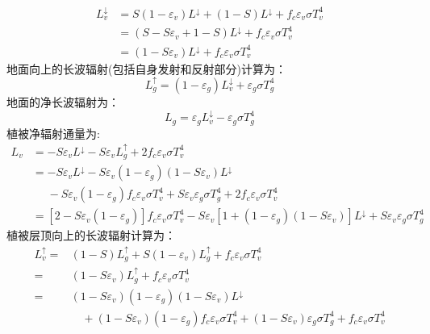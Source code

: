 \begin{equation}
\begin{aligned} 
L_{v} ^\downarrow &=S\left(1-\varepsilon_{v}\right) L ^\downarrow+(1-S) L ^\downarrow+f_{c} \varepsilon_{v} \sigma T_{v}^{4} \\ 
  &=\left(S-S \varepsilon_{v}+1-S\right) L ^\downarrow+f_{c} \varepsilon_{v} \sigma T_{v}^{4} \\ 
  &=\left(1-S \varepsilon_{v}\right) L ^\downarrow+f_{c} \varepsilon_{v} \sigma T_{v}^{4} 
\end{aligned}
\end{equation}
地面向上的长波辐射(包括自身发射和反射部分)计算为：
\begin{equation}
L_{g} ^\uparrow=\left(1-\varepsilon_{g}\right) L_{v} ^\downarrow+\varepsilon_{g} \sigma T_{g}^{4}
\end{equation}
地面的净长波辐射为：
\begin{equation}
{L_{g}}=\varepsilon_{g} L_{v} ^\downarrow -\varepsilon_{g} \sigma T_{g}^{4}
\end{equation}
植被净辐射通量为:
\begin{equation}
\begin{aligned} {L_{v}} &=-S \varepsilon_{v} L ^\downarrow-S \varepsilon_{v} L_{g} 
    ^\uparrow+2 f_{c} \varepsilon_{v} \sigma T_{v}^{4} \\ 
    &=-S \varepsilon_{v} L ^\downarrow-S 
    \varepsilon_{v}\left(1-\varepsilon_{g}\right)\left(1-S \varepsilon_{v}\right) L^\downarrow \\ 
    &\mathrel{\phantom{=}} -S \varepsilon_{v}\left(1-\varepsilon_{g}\right) f_{c} \varepsilon_{v} \sigma T_{v}^{4}+S
     \varepsilon_{v} \varepsilon_{g} \sigma T_{g}^{4}+2 f_{c} \varepsilon_{v} \sigma T_{v}^{4} \\ 
     &=\left[2-S \varepsilon_{v}\left(1-\varepsilon_{g}\right)\right] f_{c} \varepsilon_{v} 
     \sigma T_{v}^{4}-S \varepsilon_{v}\left[1+\left(1-\varepsilon_{g}\right)\left(1-S \varepsilon_{v}\right)\right]
      L ^\downarrow+S \varepsilon_{v} \varepsilon_{g} \sigma T_{g}^{4} \end{aligned}
\end{equation}
植被层顶向上的长波辐射计算为：
\begin{equation}
\begin{aligned} L_v ^\uparrow=&(1-S) L_{g} ^\uparrow+S\left(1-\varepsilon_{v}\right) L_{g} 
    ^\uparrow+f_{c} \varepsilon_{v} \sigma T_{v}^{4} \\=&\left(1-S \varepsilon_{v}\right) L_{g}
     ^\uparrow+f_{c} \varepsilon_{v} \sigma T_{v}^{4} \\=&\left(1-S \varepsilon_{v}\right)\left(1-\varepsilon_{g}\right)\left(1-S \varepsilon_{v}\right) L^\downarrow \\
      & \quad +\left(1-S \varepsilon_{v}\right)\left(1-\varepsilon_{g}\right) f_{c} \varepsilon_{v} \sigma T_{v}^{4}+\left(1-S \varepsilon_{v}\right) 
      \varepsilon_{g} \sigma T_{g}^{4}+f_{c} \varepsilon_{v} \sigma T_{v}^{4} \end{aligned}
\end{equation}
